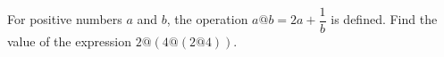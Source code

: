 For positive numbers $a$ and $b$, the operation $a@b=2a+\dfrac{1}{b}$ is defined. Find the value of the expression $2@(4@(2@4))$.
